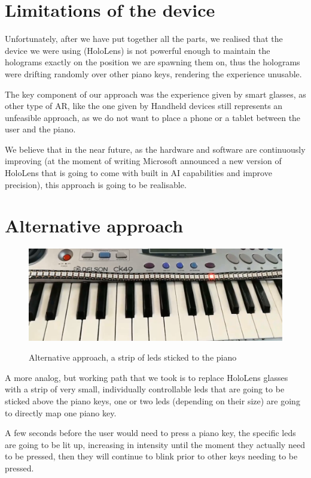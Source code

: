 \documentclass[12 pct]{report}
\begin{document}
\section{Limitations of the device}

Unfortunately, after we have put together all the parts, we realised that the device we were using (HoloLens) is not powerful enough to maintain the holograms exactly on the position we are spawning them on, thus the holograms were drifting randomly over other piano keys, rendering the experience unusable.

The key component of our approach was the experience given by smart glasses, as other type of AR, like the one given by Handheld devices still represents an unfeasible approach, as we do not want to place a phone or a tablet between the user and the piano.

We believe that in the near future, as the hardware and software are continuously improving (at the moment of writing Microsoft announced a new version of HoloLens that is going to come with built in AI capabilities and improve precision), this approach is going to be realisable.

\section{Alternative approach}

\begin{figure}[H]
\includegraphics[width=1.0\textwidth]{piano-leds}
\centering
\label{fig:feature-points}
\caption{Alternative approach, a strip of leds sticked to the piano}
\end{figure}

A more analog, but working path that we took is to replace HoloLens glasses with a strip of very small, individually controllable leds that are going to be sticked above the piano keys, one or two leds (depending on their size) are going to directly map one piano key. 

A few seconds before the user would need to press a piano key, the specific leds are going to be lit up, increasing in intensity until the moment they actually need to be pressed, then they will continue to blink prior to other keys needing to be pressed.
\end{document}

